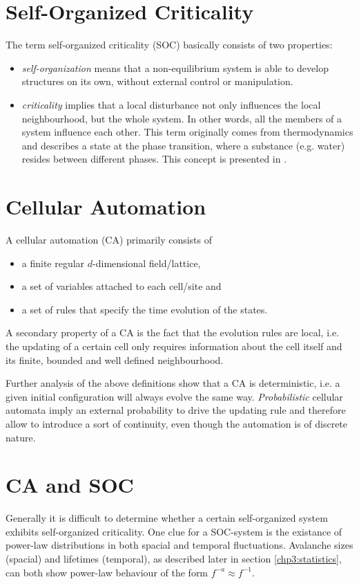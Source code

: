 \section{Self-Organized Criticality}
The term self-organized criticality (SOC) basically consists of two properties:
\begin{itemize}
\item \emph{self-organization} means that a non-equilibrium system is able to develop structures on its own, without external control or manipulation.
\item \emph{criticality} implies that a local disturbance not only influences the local neighbourhood, but the whole system. In other words, all the members of a system influence each other. This term originally comes from thermodynamics and describes a state at the phase transition, where a substance (e.g. water) resides between different phases. This concept is presented in \cite{1overf}.
\end{itemize}

\section{Cellular Automation}
A cellular automation (CA) primarily consists of
\begin{itemize}
\item a finite regular $d$-dimensional field/lattice,
\item a set of variables attached to each cell/site and
\item a set of rules that specify the time evolution of the states.
\end{itemize}
A secondary property of a CA is the fact that the evolution rules are local, i.e. the updating of a certain cell only requires information about the cell itself and its finite, bounded and well defined neighbourhood.

Further analysis of the above definitions show that a CA is deterministic, i.e. a given initial configuration will always evolve the same way. \emph{Probabilistic} cellular automata imply an external probability to drive the updating rule and therefore allow to introduce a sort of continuity, even though the automation is of discrete nature.



\section{CA and SOC}\label{sec:CAandSOC}
Generally it is difficult to determine whether a certain self-organized system exhibits self-organized criticality. One clue for a SOC-system is the existance of power-law distributions in both spacial and temporal fluctuations. Avalanche sizes (spacial) and lifetimes (temporal), as described later in section \ref{chp3:statistics}, can both show power-law behaviour of the form $f^{-a} \approx f^{-1}$.


